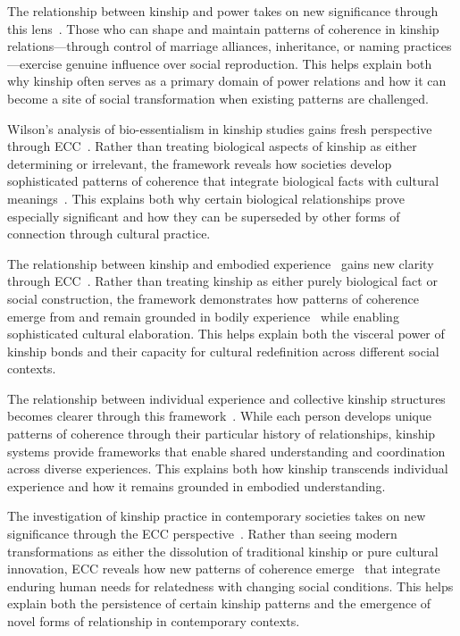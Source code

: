 The relationship between kinship and power takes on new significance through this lens~\cite{yanagisako1995naturalizing,ong2006neoliberalism}. Those who can shape and maintain patterns of coherence in kinship relations—through control of marriage alliances, inheritance, or naming practices—exercise genuine influence over social reproduction. This helps explain both why kinship often serves as a primary domain of power relations and how it can become a site of social transformation when existing patterns are challenged.

Wilson's analysis of bio-essentialism in kinship studies gains fresh perspective through ECC~\cite{wilson2016kinship}. Rather than treating biological aspects of kinship as either determining or irrelevant, the framework reveals how societies develop sophisticated patterns of coherence that integrate biological facts with cultural meanings~\cite{ingold2011being}. This explains both why certain biological relationships prove especially significant and how they can be superseded by other forms of connection through cultural practice.

The relationship between kinship and embodied experience~ gains new clarity through ECC~\cite{strathern1992after,jackson1989knowledge}. Rather than treating kinship as either purely biological fact or social construction, the framework demonstrates how patterns of coherence emerge from and remain grounded in bodily experience~ while enabling sophisticated cultural elaboration. This helps explain both the visceral power of kinship bonds and their capacity for cultural redefinition across different social contexts.

The relationship between individual experience and collective kinship structures becomes clearer through this framework~\cite{mckinnon2005neoliberal,throop2003articulating}. While each person develops unique patterns of coherence through their particular history of relationships, kinship systems provide frameworks that enable shared understanding and coordination across diverse experiences. This explains both how kinship transcends individual experience and how it remains grounded in embodied understanding.

The investigation of kinship practice in contemporary societies takes on new significance through the ECC perspective~\cite{carsten2004after,appadurai1996modernity}. Rather than seeing modern transformations as either the dissolution of traditional kinship or pure cultural innovation, ECC reveals how new patterns of coherence emerge~ that integrate enduring human needs for relatedness with changing social conditions. This helps explain both the persistence of certain kinship patterns and the emergence of novel forms of relationship in contemporary contexts.

